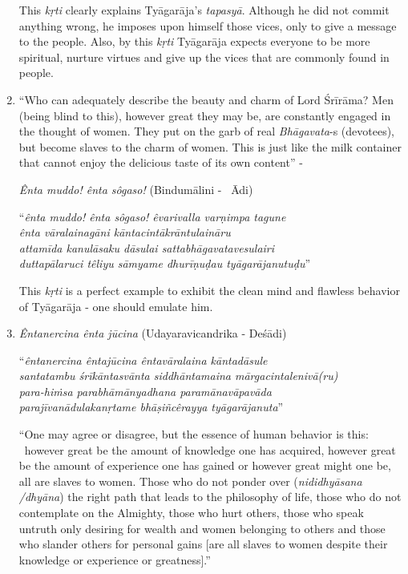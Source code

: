 \begin{enumerate}
 This \textit{kṛti} clearly explains Tyāgarāja’s \textit{tapasyā}. Although he did not commit anything wrong, he imposes upon himself those vices, only to give a message to the people. Also, by this \textit{kṛti} Tyāgarāja expects everyone to be more spiritual, nurture virtues and give up the vices that are commonly found in people.

 \item 
 “Who can adequately describe the beauty and charm of Lord Śrīrāma? Men (being blind to this), however great they may be, are constantly engaged in the thought of women. They put on the garb of real \textit{Bhāgavata}-s (devotees), but become slaves to the charm of women. This is just like the milk container that cannot enjoy the delicious taste of its own content” -

 \textit{Ênta muddo! ênta sôgaso!} (Bindumālini -  Ādi)

\begin{longquote}
“\textit{ênta muddo! ênta sôgaso! êvarivalla varṇimpa tagune}\\ \textit{ênta vāralainagāni kāntacintākrāntulaināru}\\ \textit{attamīda kanulāsaku dāsulai sattabhāgavatavesulairi}\\\textit{duttapālaruci têliyu sāmyame dhurīṇuḍau tyāgarājanutuḍu}”
\end{longquote}

 This \textit{kṛti} is a perfect example to exhibit the clean mind and flawless behavior of Tyāgarāja - one should emulate him.

 \item 
 \textit{Êntanercina ênta jūcina} (Udayaravicandrika - Deśādi)

\begin{longquote}
“\textit{êntanercina êntajūcina êntavāralaina kāntadāsule}\\ \textit{santatambu śrīkāntasvānta siddhāntamaina mārgacintalenivā(ru)}\\ \textit{para-hiṁsa parabhāmānyadhana paramānavāpavāda} \\ \textit{parajīvanādulakanṛtame bhāṣiñcêrayya tyāgarājanuta}”
\end{longquote}

 “One may agree or disagree, but the essence of human behavior is this:  however great be the amount of knowledge one has acquired, however great be the amount of experience one has gained or however great might one be, all are slaves to women. Those who do not ponder over (\textit{nididhyāsana /dhyāna}) the right path that leads to the philosophy of life, those who do not contemplate on the Almighty, those who hurt others, those who speak untruth only desiring for wealth and women belonging to others and those who slander others for personal gains [are all slaves to women despite their knowledge or experience or greatness].”


\end{enumerate}
